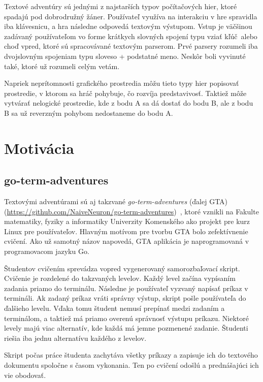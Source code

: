 Textové adventúry sú jednými z najstarších typov počítačových hier, ktoré spadajú
pod dobrodružný žáner. Používateľ využíva na interakciu v hre spravidla iba klávesnicu,
a hra následne odpovedá textovým výstupom.
Vstup je väčšinou zadávaný používateľom vo forme krátkych slovných spojení
typu \glqq vziať kľúč\grqq~alebo \glqq choď vpred\grqq, ktoré sú spracovávané
textovým parserom. Prvé parsery rozumeli iba dvojslovným spojeniam typu sloveso + podstatné meno. Neskôr boli vyvinuté také, ktoré už rozumeli celým vetám.

Napriek neprítomnosti grafického prostredia môžu tieto typy hier popisovať prostredie, v ktorom sa hráč pohybuje, čo rozvíja predstavivosť. Taktiež môže vytvárať nelogické
prostredie, kde z bodu A sa dá dostať do bodu B, ale z bodu B sa už reverzným pohybom
nedostaneme do bodu A.~\cite{bib:adventures}


\section{Motivácia}
\label{sec:motivacia}

\subsection{go-term-adventures}
\label{sec:motivacia:gta}

Textovými adventúrami sú aj takzvané \textit{go-term-adventures} (ďalej GTA) (\url{https://github.com/NaiveNeuron/go-term-adventures})~\cite{bib:gta}, ktoré vznikli
na Fakulte matematiky, fyziky a informatiky Univerzity Komenského ako projekt pre kurz Linux pre používateľov. Hlavným motívom pre tvorbu GTA bolo zefektívnenie cvičení.
Ako už samotný názov napovedá, GTA aplikácia je naprogramovaná v programovacom
jazyku Go.

Študentov cvičením sprevádza vopred vygenerovaný samorozbaľovací skript. Cvičenie
je rozdelené do takzvaných levelov. Každý level začína vypísaním zadania priamo do
terminálu. Následne je používateľ vyzvaný napísať príkaz v termináli. Ak zadaný príkaz
vráti správny výstup, skript pošle používateľa do ďalšieho levelu. Vďaka tomu
študent nemusí prepínať medzi zadaním a terminálom, a taktiež má priamo overenú
správnosť výstupu príkazu. Niektoré levely majú viac alternatív, kde každá
má jemne pozmenené zadanie. Študenti riešia iba jednu alternatívu každého z levelov.

Skript počas práce študenta zachytáva všetky príkazy a zapisuje ich do textového
dokumentu spoločne s časom vykonania. Ten po cvičení odošlú a prednášajúci ich vie
obodovať.


